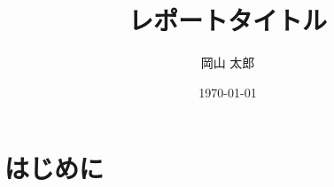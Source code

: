 \documentclass{jsarticle}
\title{レポートタイトル}
\author{岡山 太郎}
\date{\today}
\begin{document}
\maketitle

\section{はじめに}
\end{document}
